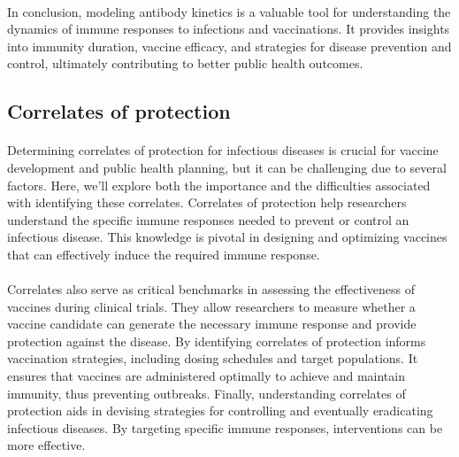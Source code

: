 \documentclass{article}
\begin{document}
\paragraph{}In conclusion, modeling antibody kinetics is a valuable tool for understanding the dynamics of immune responses to infections and vaccinations. It provides insights into immunity duration, vaccine efficacy, and strategies for disease prevention and control, ultimately contributing to better public health outcomes.

\subsection{Correlates of protection}
\paragraph{} Determining correlates of protection for infectious diseases is crucial for vaccine development and public health planning, but it can be challenging due to several factors. Here, we'll explore both the importance and the difficulties associated with identifying these correlates. Correlates of protection help researchers understand the specific immune responses needed to prevent or control an infectious disease. This knowledge is pivotal in designing and optimizing vaccines that can effectively induce the required immune response.

\paragraph{} Correlates also serve as critical benchmarks in assessing the effectiveness of vaccines during clinical trials. They allow researchers to measure whether a vaccine candidate can generate the necessary immune response and provide protection against the disease. By identifying correlates of protection informs vaccination strategies, including dosing schedules and target populations. It ensures that vaccines are administered optimally to achieve and maintain immunity, thus preventing outbreaks. Finally, understanding correlates of protection aids in devising strategies for controlling and eventually eradicating infectious diseases. By targeting specific immune responses, interventions can be more effective.
\end{document}
